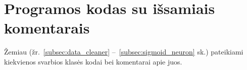 \section{Programos kodas su išsamiais komentarais}
\label{sec:programos_kodas}

Žemiau (žr.~\ref{subsec:data_cleaner} –~\ref{subsec:sigmoid_neuron} sk.) pateikiami kiekvienos svarbios klasės kodai bei komentarai apie juos.



